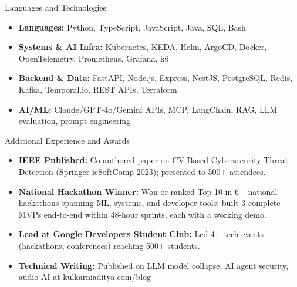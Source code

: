 \documentclass[]{mcdowellcv}
\begin{document}
\begin{cvsection}{Languages and Technologies}
  \begin{cvsubsection}{}{}{}
    \begin{itemize}
      \item \textbf{Languages:} Python, TypeScript, JavaScript, Java, SQL, Bash
      \item \textbf{Systems \& AI Infra:} Kubernetes, KEDA, Helm, ArgoCD, Docker, OpenTelemetry, Prometheus, Grafana, k6
      \item \textbf{Backend \& Data:} FastAPI, Node.js, Express, NestJS, PostgreSQL, Redis, Kafka, Temporal.io, REST APIs, Terraform
      \item \textbf{AI/ML:} Claude/GPT-4o/Gemini APIs, MCP, LangChain, RAG, LLM evaluation, prompt engineering
    \end{itemize}
  \end{cvsubsection}
\end{cvsection}

\begin{cvsection}{Additional Experience and Awards}
  \begin{cvsubsection}{}{}{}
    \begin{itemize}
      \item \textbf{IEEE Published:} Co-authored paper on CV-Based Cybersecurity Threat Detection (Springer icSoftComp 2023); presented to 500+ attendees.
      \item \textbf{National Hackathon Winner:} Won or ranked Top 10 in 6+ national hackathons spanning ML, systems, and developer tools; built 3 complete MVPs end-to-end within 48-hour sprints, each with a working demo.
      \item \textbf{Lead at Google Developers Student Club:} Led 4+ tech events (hackathons, conferences) reaching 500+ students.
      \item \textbf{Technical Writing:} Published on LLM model collapse, AI agent security, audio AI at \href{https://www.kulkarniaditya.com/blog}{kulkarniaditya.com/blog}
    \end{itemize}
  \end{cvsubsection}
\end{cvsection}
\end{document}
